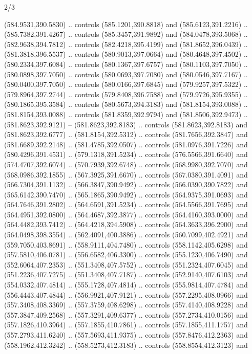 \begin{flagdescription}{2/3}
\begin{scope}[xshift=0.5\flaglength,yshift=0.5\flagwidth,scale=\flagwidth/495.65]
\begin{scope}[y=0.8pt, x=0.8pt, yscale=-1,shift={(-463.76,-309.78)}]
  (584.9531,390.5830) .. controls (585.1201,390.8818) and (585.6123,391.2216) ..
  (585.7382,391.4267) .. controls (585.3457,391.9892) and (584.0478,393.5068) ..
  (582.9638,394.7812) .. controls (582.4218,395.4199) and (581.8652,396.0439) ..
  (581.3818,396.5537) .. controls (580.9013,397.0664) and (580.4648,397.4502) ..
  (580.2334,397.6084) .. controls (580.1367,397.6757) and (580.1103,397.7050) ..
  (580.0898,397.7050) .. controls (580.0693,397.7080) and (580.0546,397.7167) ..
  (580.0400,397.7050) .. controls (580.0166,397.6845) and (579.9257,397.5322) ..
  (579.8964,397.2744) .. controls (579.8408,396.7588) and (579.9726,395.9355) ..
  (580.1865,395.3584) .. controls (580.5673,394.3183) and (581.8154,393.0088) ..
  (581.8154,393.0088) .. controls (581.8359,392.9794) and (581.8506,392.9473) ..
  (581.8623,392.9121) -- (581.8623,392.8183) .. controls (581.8623,392.8183) and
  (581.8623,392.6777) .. (581.8154,392.5312) .. controls (581.7656,392.3847) and
  (581.6689,392.2148) .. (581.4785,392.0507) .. controls (581.0976,391.7226) and
  (580.4296,391.4531) .. (579.1318,391.5234) .. controls (576.5566,391.6640) and
  (574.4707,392.6074) .. (570.7939,392.6748) .. controls (568.9980,392.7070) and
  (568.0986,392.1855) .. (567.3925,391.6670) .. controls (567.0380,391.4091) and
  (566.7304,391.1132) .. (566.3847,390.9492) .. controls (566.0390,390.7822) and
  (565.6142,390.7470) .. (565.1865,390.9492) .. controls (564.9375,391.0693) and
  (564.7646,391.2802) .. (564.6591,391.5234) .. controls (564.5566,391.7695) and
  (564.4951,392.0800) .. (564.4687,392.3877) .. controls (564.4160,393.0000) and
  (564.4482,393.7412) .. (564.4218,394.5908) .. controls (564.3633,396.2900) and
  (564.0498,398.3554) .. (562.4091,400.3886) .. controls (560.7099,402.4921) and
  (559.7050,403.8691) .. (558.9111,404.7480) .. controls (558.1142,405.6298) and
  (557.5810,406.0781) .. (556.6582,406.3300) .. controls (555.1230,406.7490) and
  (552.6064,407.2353) .. (551.3408,407.5752) .. controls (551.2324,407.6045) and
  (551.2236,407.7275) .. (551.3408,407.7187) .. controls (552.9140,407.6103) and
  (554.0332,407.4814) .. (555.1728,407.4814) .. controls (555.9814,407.4784) and
  (556.4443,407.4844) .. (556.9921,407.9121) .. controls (557.2295,408.0966) and
  (557.3408,408.3369) .. (557.3759,408.6298) .. controls (557.4140,408.9228) and
  (557.3847,409.2568) .. (557.3291,409.6377) .. controls (557.2734,410.0156) and
  (557.1826,410.3964) .. (557.1855,410.7861) .. controls (557.1855,411.1757) and
  (557.2793,411.6240) .. (557.5693,411.9375) .. controls (557.8476,412.2363) and
  (558.1962,412.3242) .. (558.5273,412.3183) .. controls (558.8554,412.3123) and

\end{scope}
\end{scope}
\end{flagdescription}
